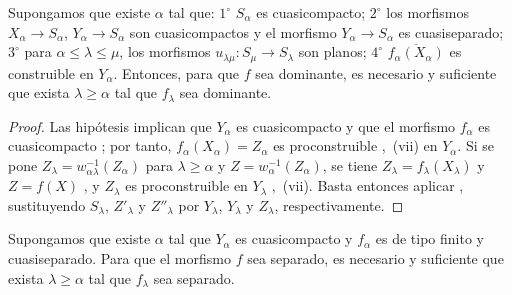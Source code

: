 \begin{proposition}[8.10.3]
\label{IV.8.10.3}
Supongamos que existe $\alpha$ tal que: $1^\circ$ $S_\alpha$ es cuasicompacto; $2^\circ$ los morfismos $X_\alpha\to S_\alpha$, $Y_\alpha\to S_\alpha$ son cuasicompactos y el morfismo $Y_\alpha\to S_\alpha$ es cuasiseparado; $3^\circ$ para $\alpha\leqslant\lambda\leqslant\mu$, los morfismos $u_{\lambda\mu}:S_\mu\to S_\lambda$ son planos; $4^\circ$ $\overline{f_\alpha(X_\alpha)}$ es construible en $Y_\alpha$.
Entonces, para que $f$ sea dominante, es necesario y suficiente que exista $\lambda\geqslant\alpha$ tal que $f_\lambda$ sea dominante.
\end{proposition}

\begin{proof}
Las hipótesis implican que $Y_\alpha$ es cuasicompacto y que el morfismo $f_\alpha$ es cuasicompacto ; por tanto, $f_\alpha(X_\alpha)=Z_\alpha$ es proconstruible ,~(vii) en $Y_\alpha$.
Si se pone $Z_\lambda=w_{\alpha\lambda}^{-1}(Z_\alpha)$ para $\lambda\geqslant\alpha$ y $Z=w_\alpha^{-1}(Z_\alpha)$, se tiene $Z_\lambda=f_\lambda(X_\lambda)$ y $Z=f(X)$ , y $Z_\lambda$ es proconstruible en $Y_\lambda$ ,~(vii).
Basta entonces aplicar , sustituyendo $S_\lambda$, $Z'_\lambda$ y $Z''_\lambda$ por $Y_\lambda$, $Y_\lambda$ y $Z_\lambda$, respectivamente.
\end{proof}

\begin{proposition}[8.10.4]
\label{IV.8.10.4}
Supongamos que existe $\alpha$ tal que $Y_\alpha$ es cuasicompacto y $f_\alpha$ es de tipo finito y cuasiseparado.
Para que el morfismo $f$ sea separado, es necesario y suficiente que exista $\lambda\geqslant\alpha$ tal que $f_\lambda$ sea separado.
\end{proposition}

